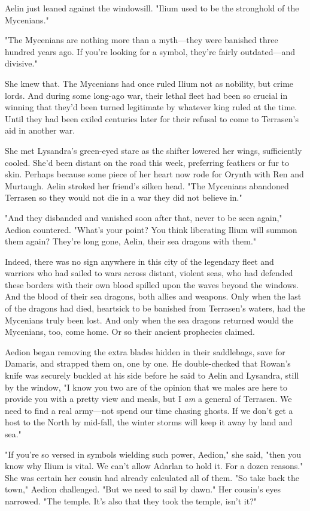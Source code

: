 Aelin just leaned against the windowsill. "Ilium used to be the stronghold of the Mycenians."

"The Mycenians are nothing more than a myth---they were banished three hundred years ago. If you're looking for a symbol, they're fairly outdated---and divisive."

She knew that. The Mycenians had once ruled Ilium not as nobility, but crime lords. And during some long-ago war, their lethal fleet had been so crucial in winning that they'd been turned legitimate by whatever king ruled at the time. Until they had been exiled centuries later for their refusal to come to Terrasen's aid in another war.

She met Lysandra's green-eyed stare as the shifter lowered her wings, sufficiently cooled. She'd been distant on the road this week, preferring feathers or fur to skin. Perhaps because some piece of her heart now rode for Orynth with Ren and Murtaugh. Aelin stroked her friend's silken head. "The Mycenians abandoned Terrasen so they would not die in a war they did not believe in."

"And they disbanded and vanished soon after that, never to be seen again," Aedion countered. "What's your point? You think liberating Ilium will summon them again? They're long gone, Aelin, their sea dragons with them."

Indeed, there was no sign anywhere in this city of the legendary fleet and warriors who had sailed to wars across distant, violent seas, who had defended these borders with their own blood spilled upon the waves beyond the windows. And the blood of their sea dragons, both allies and weapons. Only when the last of the dragons had died, heartsick to be banished from Terrasen's waters, had the Mycenians truly been lost. And only when the sea dragons returned would the Mycenians, too, come home. Or so their ancient prophecies claimed.

Aedion began removing the extra blades hidden in their saddlebags, save for Damaris, and strapped them on, one by one. He double-checked that Rowan's knife was securely buckled at his side before he said to Aelin and Lysandra, still by the window, "I know you two are of the opinion that we males are here to provide you with a pretty view and meals, but I \emph{am} a general of Terrasen. We need to find a real army---not spend our time chasing ghosts. If we don't get a host to the North by mid-fall, the winter storms will keep it away by land and sea."

"If you're so versed in symbols wielding such power, Aedion," she said, "then you know why Ilium is vital. We can't allow Adarlan to hold it. For a dozen reasons." She was certain her cousin had already calculated all of them. "So take back the town," Aedion challenged. "But we need to sail by dawn." Her cousin's eyes narrowed. "The temple. It's also that they took the temple, isn't it?"

